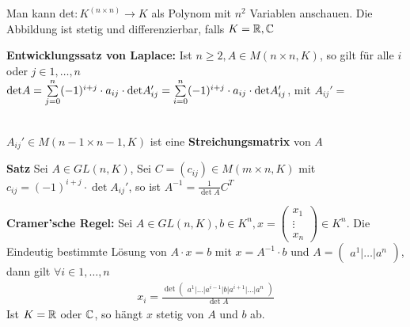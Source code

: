 Man kann $\text{det}: K^(n \times n) \rightarrow K$ als Polynom mit $n^2$ Variablen anschauen. Die Abbildung ist stetig und differenzierbar, falls $K = \mathbb{R}, \mathbb{C}$
\begin{mdframed}
\textbf{Entwicklungssatz von Laplace:} \quad Ist $n \geq 2, A \in M(n\times n,K)$, so gilt für alle $i$ oder $j \in  {1, \ldots, n}$\\
$\text{det}A = \underset{j = 0}{\overset{n}{\sum}} (-1)^{i+j} \cdot a_{ij} \cdot \text{det} A_{ij}' = \underset{i = 0}{\overset{n}{\sum}} (-1)^{i+j} \cdot a_{ij} \cdot \text{det} A_{ij}'$, \quad mit $A_{ij}' =$
\\
$A_{ij}' \in M(n-1\times n-1,K)$ ist eine \textbf{Streichungsmatrix} von $A$
\end{mdframed}
\textbf{Satz} Sei $A \in GL(n,K)$, Sei $C = (c_{ij}) \in M(m\times n,K)$ mit $c_{ij} = (-1)^{i+j} \cdot \det A_{ij}'$, so ist ${A}^{-1} = \frac{1}{\det A} C^T$\\
\begin{mdframed}
\textbf{Cramer'sche Regel:} \quad Sei $A \in GL(n,K), b \in K^n, x = \begin{pmatrix}
x_{1} \\ \vdots \\	 x_{n}
\end{pmatrix} \in K^n$. Die Eindeutig bestimmte Lösung von $A \cdot x = b$ mit $x = {A}^{-1} \cdot b$ und $A = \begin{pmatrix}
    a^1 \vert \ldots \vert a^n
\end{pmatrix}$, dann gilt $\forall i \in {1, \ldots, n}$ 
\begin{align*}
    x_i = \frac{\det \begin{pmatrix}
        a^1 \vert \ldots \vert a^{i-1} \vert b \vert a^{i+1} \vert \ldots \vert a^n
    \end{pmatrix}}{\det A}
\end{align*}
Ist $K = \mathbb{R}$ oder $\mathbb{C}$, so hängt $x$ stetig von $A$ und $b$ ab.
\end{mdframed}
